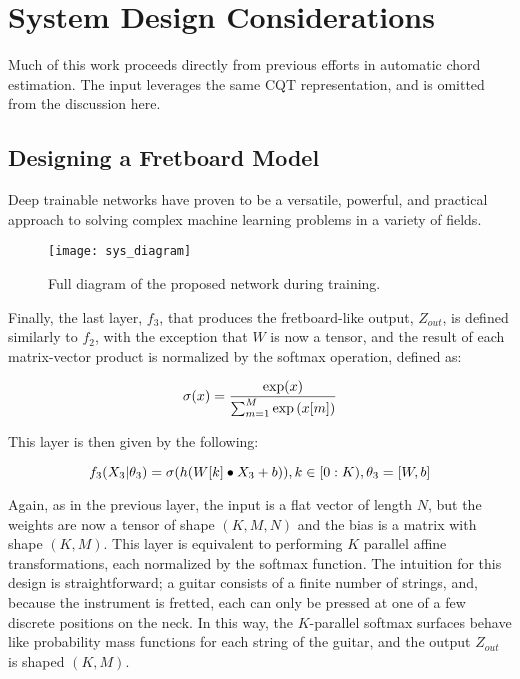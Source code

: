 \section{System Design Considerations}

Much of this work proceeds directly from previous efforts in automatic chord estimation.
The input leverages the same CQT representation, and is omitted from the discussion here.


\subsection{Designing a Fretboard Model}
\label{subsec:design}

Deep trainable networks have proven to be a versatile, powerful, and practical approach to solving complex machine learning problems in a variety of fields.

\begin{figure}[t!]
  \centering
  \centerline{\texttt{[image: sys\_diagram]}}
\caption{Full diagram of the proposed network during training.}
\label{fig:sys_diagram}
%
\end{figure}


Finally, the last layer, $f_3$, that produces the fretboard-like output, $Z_{out}$, is defined similarly to $f_2$, with the exception that $W$ is now a tensor, and the result of each matrix-vector product is normalized by the softmax operation, defined as:

\begin{equation}
\label{eq:softmax}
\small
\sigma(x)=\frac{\exp(x)}{ \sum_{m=1}^M\exp{(x[m])}}
\end{equation}

\noindent This layer is then given by the following:

\begin{equation}
\label{eq:softmax_layer}
\small
f_3(X_{3} \vert \theta_3) = \sigma (h( W[k] \bullet X_{3} + b)), k \in [0:K), \theta_3 = [W, b]
\end{equation}

\noindent Again, as in the previous layer, the input is a flat vector of length $N$, but the weights are now a tensor of shape $(K,M,N)$ and the bias is a matrix with shape $(K,M)$.
This layer is equivalent to performing $K$ parallel affine transformations, each normalized by the softmax function.
The intuition for this design is straightforward; a guitar consists of a finite number of strings, and, because the instrument is fretted, each can only be pressed at one of a few discrete positions on the neck.
In this way, the $K$-parallel softmax surfaces behave like probability mass functions for each string of the guitar, and the output $Z_{out}$ is shaped $(K, M)$.



